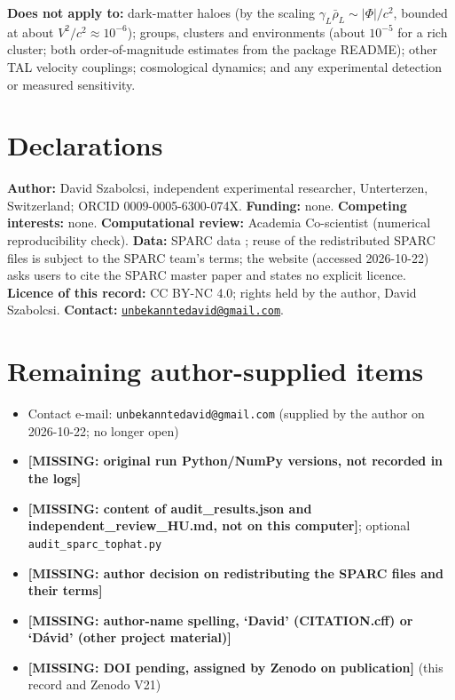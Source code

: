 \documentclass[10pt,a4paper]{article}
\newcommand{\missing}[1]{\textcolor{red!70!black}{\textbf{[MISSING: #1]}}}
\begin{document}
\textbf{Does not apply to:} dark-matter haloes (by the scaling $\gamma_L\bar\rho_L\sim|\Phi|/c^2$, bounded at about $V^2/c^2\approx10^{-6}$); groups, clusters and environments (about $10^{-5}$ for a rich cluster; both order-of-magnitude estimates from the package README); other TAL velocity couplings; cosmological dynamics; and any experimental detection or measured sensitivity.

\section{Declarations}
\textbf{Author:} David Szabolcsi, independent experimental researcher, Unterterzen, Switzerland; ORCID 0009-0005-6300-074X. \textbf{Funding:} none. \textbf{Competing interests:} none. \textbf{Computational review:} Academia Co-scientist (numerical reproducibility check). \textbf{Data:} SPARC data \cite{lelli2016}; reuse of the redistributed SPARC files is subject to the SPARC team's terms; the website (accessed 2026-10-22) asks users to cite the SPARC master paper \cite{lelli2016} and states no explicit licence. \textbf{Licence of this record:} CC BY-NC 4.0; rights held by the author, David Szabolcsi. \textbf{Contact:} \href{mailto:unbekanntedavid@gmail.com}{\texttt{unbekanntedavid@gmail.com}}.

\section{Remaining author-supplied items}\label{sec:open}
{\small\begin{itemize}\itemsep0pt
\item Contact e-mail: \texttt{unbekanntedavid@gmail.com} (supplied by the author on 2026-10-22; no longer open)
\item \missing{original run Python/NumPy versions, not recorded in the logs}
\item \missing{content of audit\_results.json and independent\_review\_HU.md, not on this computer}; optional \texttt{audit\_sparc\_tophat.py}
\item \missing{author decision on redistributing the SPARC files and their terms}
\item \missing{author-name spelling, `David' (CITATION.cff) or `D\'avid' (other project material)}
\item \missing{DOI pending, assigned by Zenodo on publication} (this record and Zenodo V21)
\end{itemize}}
\end{document}
